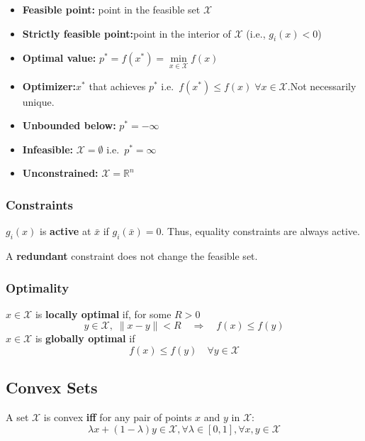 \newpar{}
\begin{itemize}
    \item \textbf{Feasible point:} point in the feasible set $\mathcal{X}$
    \item \textbf{Strictly feasible point:}\newline point in the interior of $\mathcal{X}$ (i.e., $g_i(x)<0$)
    \item \textbf{Optimal value:} $p^*=f(x^*) = \min\limits_{x\in\mathcal{X}} f(x)$
    \item \textbf{Optimizer:}\newline $x^*$ that achieves $p^*$ i.e.\ $f(x^*)\leq f(x)\; \forall x\in \mathcal{X}$.\newline Not necessarily unique.
    \item \textbf{Unbounded below:} $p^*=-\infty$
    \item \textbf{Infeasible:} $\mathcal{X}=\emptyset$ i.e.\ $p^* = \infty$
    \item \textbf{Unconstrained:} $\mathcal{X}=\mathbb{R}^n$
\end{itemize}

\renewcommand{\arraystretch}{1}
\setlength\tabcolsep{\oldtabcolsep}

\subsubsection{Constraints}
$g_i(x)$ is \textbf{active} at $\bar{x}$ if $g_i(\bar{x})=0$. Thus, equality constraints are always active.

\newpar{}
A \textbf{redundant} constraint does not change the feasible set.

\subsubsection{Optimality}
$x\in \mathcal{X}$ is \textbf{locally optimal} if, for some $R>0$
\begin{equation*}
    y\in \mathcal{X},\; {\|x-y\|}<R\quad \Rightarrow\quad f(x)\leq f(y)
\end{equation*}
$x\in \mathcal{X}$ is \textbf{globally optimal} if
\begin{equation*}
    f(x)\leq f(y)\quad \forall y\in \mathcal{X}
\end{equation*}


\subsection{Convex Sets}
A set $\mathcal{X}$ is convex \textbf{iff} for any pair of points $x$ and $y$ in $\mathcal{X}$:
\begin{equation*}
    \lambda x+(1-\lambda)y\in\mathcal{X},\forall\lambda\in[0,1],\forall x,y\in\mathcal{X}
\end{equation*}
\newpar{}

